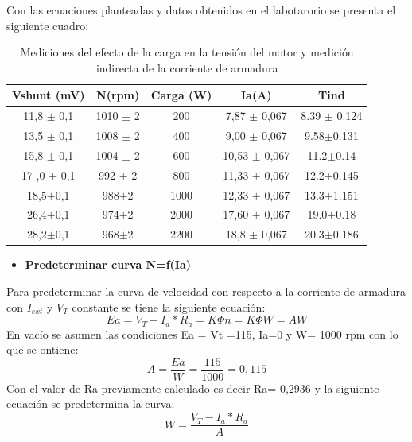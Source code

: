 \documentclass[11pt,letterpaper]{article}     %
\begin{document}
		Con las ecuaciones planteadas y datos obtenidos en el labotarorio se presenta el siguiente cuadro:
	\begin{table}[H]
		\centering
			\caption{Mediciones del efecto de la carga en la tensión del motor y medición indirecta de la corriente de armadura}
			\label{Cuadro valores de motor Iext ctte}
		\begin{tabular}{|c|c|c|c|c|}
			\hline
			Vshunt (mV) & N(rpm) & Carga (W) &Ia(A)& Tind\\ \hline
			11,8 $\pm$ 0,1 & 1010 $\pm$ 2 & 200 & 7,87 $\pm$ 0,067&8.39 $\pm$ 0.124\\ \hline
			13,5 $\pm$ 0,1 & 1008 $\pm$ 2 & 400 & 9,00 $\pm$ 0,067&9.58$\pm$0.131\\ \hline
			15,8 $\pm$ 0,1 & 1004 $\pm$ 2 & 600 & 10,53 $\pm$ 0,067&11.2$\pm$0.14\\ \hline
			17 ,0 $\pm$ 0,1 & 992 $\pm$ 2 & 800 & 11,33 $\pm$ 0,067& 12.2$\pm$0.145\\ \hline
			18,5$\pm$0,1 & 988$\pm$2 & 1000 & 12,33 $\pm$ 0,067& 13.3$\pm$1.151\\ \hline
			26,4$\pm$0,1 & 974$\pm$2 & 2000 & 17,60 $\pm$ 0,067&19.0$\pm$0.18\\ \hline
			28,2$\pm$0,1 & 968$\pm$2 & 2200 & 18,8 $\pm$ 0,067&20.3$\pm$0.186\\ \hline
		\end{tabular}
	\end{table}
	\begin{itemize}
		\item \textbf{Predeterminar curva N=f(Ia)}
	\end{itemize}
	Para predeterminar la curva de velocidad con respecto a la corriente de armadura con $I_{ext}$ y $V_{T}$ constante se tiene la siguiente ecuación:
	\begin{equation}
		Ea= V_T - I_a * R_a = K \Phi n = K \Phi  W= AW 
	\end{equation}
	En vacío se asumen las condiciones Ea = Vt =115, Ia=0 y W= 1000 rpm con lo que se ontiene:
	\begin{equation}
		A=\frac{Ea}{W}= \frac{115}{1000}=0,115
		\label{ecuacion A}
	\end{equation}
	Con el valor de Ra previamente calculado es decir Ra= 0,2936 y la siguiente ecuación se predetermina la curva:
	\begin{equation}
		W=\frac{V_T - I_a * R_a}{A}
		\label{ec.Velocidad corriente}
	\end{equation}
\end{document}
